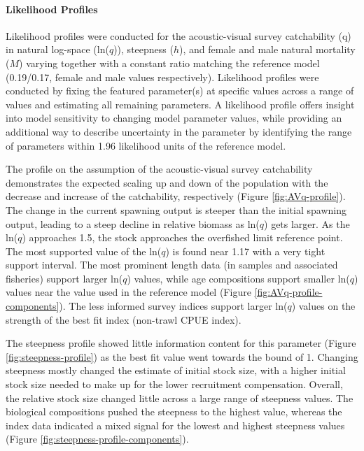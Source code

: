 \documentclass[11pt,
  english,
  letterpaper,
]{article}
\begin{document}
\hypertarget{likelihood-profiles}{%
\paragraph{Likelihood Profiles}\label{likelihood-profiles}}

Likelihood profiles were conducted for the acoustic-visual survey catchability (q) in natural log-space (ln(\(q\))), steepness (\(h\)), and female and male natural mortality (\(M\)) varying together with a constant ratio matching the reference model (0.19/0.17, female and male values respectively). Likelihood profiles were conducted by fixing the featured parameter(s) at specific values across a range of values and estimating all remaining parameters. A likelihood profile offers insight into model sensitivity to changing model parameter values, while providing an additional way to describe uncertainty in the parameter by identifying the range of parameters within 1.96 likelihood units of the reference model.

The profile on the assumption of the acoustic-visual survey catchability demonstrates the expected scaling up and down of the population with the decrease and increase of the catchability, respectively (Figure \ref{fig:AVq-profile}). The change in the current spawning output is steeper than the initial spawning output, leading to a steep decline in relative biomass as ln(\(q\)) gets larger. As the ln(\(q\)) approaches 1.5, the stock approaches the overfished limit reference point. The most supported value of the ln(\(q\)) is found near 1.17 with a very tight support interval. The most prominent length data (in samples and associated fisheries) support larger ln(\(q\)) values, while age compositions support smaller ln(\(q\)) values near the value used in the reference model (Figure \ref{fig:AVq-profile-components}). The less informed survey indices support larger ln(\(q\)) values on the strength of the best fit index (non-trawl CPUE index).

The steepness profile showed little information content for this parameter (Figure \ref{fig:steepness-profile}) as the best fit value went towards the bound of 1. Changing steepness mostly changed the estimate of initial stock size, with a higher initial stock size needed to make up for the lower recruitment compensation. Overall, the relative stock size changed little across a large range of steepness values. The biological compositions pushed the steepness to the highest value, whereas the index data indicated a mixed signal for the lowest and highest steepness values (Figure \ref{fig:steepness-profile-components}).
\end{document}
